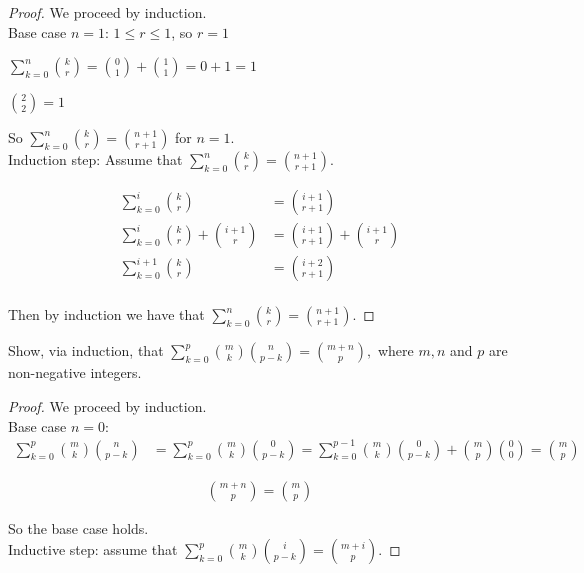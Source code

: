 \documentclass[12 pt]{exam}
\begin{document}
\begin{questions}
\begin{solution}\begin{proof}
We proceed by induction.\\

Base case $n=1$: $1 \le r \le 1$, so $r = 1$

$\sum_{k=0}^n \binom{k}{r} = \binom{0}{1} + \binom{1}{1} = 0 + 1 = 1$

$\binom{2}{2} = 1$

So $\sum_{k=0}^n \binom{k}{r} = \binom{n+1}{r+1}$ for $n=1$.\\

Induction step: Assume that $\sum_{k=0}^n \binom{k}{r} = \binom{n+1}{r+1}$.

\begin{align*}
    \sum_{k=0}^i \binom{k}{r} &= \binom{i+1}{r+1}\\
    \sum_{k=0}^i \binom{k}{r} + \binom{i+1}{r} &= \binom{i+1}{r+1} + \binom{i+1}{r}\\
    \sum_{k=0}^{i+1} \binom{k}{r} &= \binom{i+2}{r+1}\\
\end{align*}

Then by induction we have that $\sum_{k=0}^n \binom{k}{r} = \binom{n+1}{r+1}$.
\end{proof}\end{solution}



\question Show, via induction, that $\sum_{k=0}^p \binom{m}{k}\binom{n}{p-k} = \binom{m+n}{p},$ where $m,n$ and $p$ are non-negative integers. 

\begin{solution}\begin{proof}
We proceed by induction.\\

Base case $n=0$:
\begin{align*}
    \sum_{k=0}^p \binom{m}{k} \binom{n}{p-k} &= \sum_{k=0}^p \binom{m}{k} \binom{0}{p-k}
    = \sum_{k=0}^{p-1} \binom{m}{k} \binom{0}{p-k} + \binom{m}{p} \binom{0}{0} = \binom{m}{p}
\end{align*}

\begin{align*}
    \binom{m+n}{p} = \binom{m}{p}
\end{align*}

So the base case holds.\\


Inductive step: assume that $\sum_{k=0}^p \binom{m}{k} \binom{i}{p-k} = \binom{m+i}{p}$.


\end{proof}
\end{solution}
\end{questions}
\end{document}
